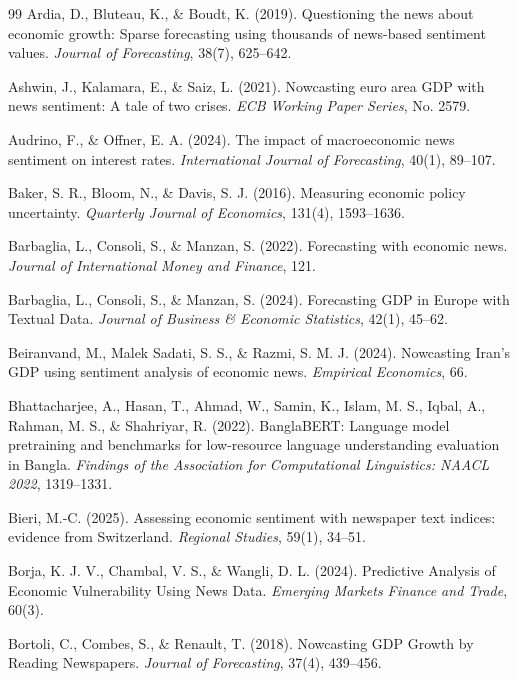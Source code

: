 \documentclass[12pt,oneside]{article}
\begin{document}
\begin{thebibliography}{99}
 Ardia, D., Bluteau, K., \& Boudt, K. (2019). Questioning the news about economic growth: Sparse forecasting using thousands of news-based sentiment values. \textit{Journal of Forecasting}, 38(7), 625--642.

 Ashwin, J., Kalamara, E., \& Saiz, L. (2021). Nowcasting euro area GDP with news sentiment: A tale of two crises. \textit{ECB Working Paper Series}, No. 2579.

 Audrino, F., \& Offner, E. A. (2024). The impact of macroeconomic news sentiment on interest rates. \textit{International Journal of Forecasting}, 40(1), 89--107.

 Baker, S. R., Bloom, N., \& Davis, S. J. (2016). Measuring economic policy uncertainty. \textit{Quarterly Journal of Economics}, 131(4), 1593--1636.

 Barbaglia, L., Consoli, S., \& Manzan, S. (2022). Forecasting with economic news. \textit{Journal of International Money and Finance}, 121.

 Barbaglia, L., Consoli, S., \& Manzan, S. (2024). Forecasting GDP in Europe with Textual Data. \textit{Journal of Business \& Economic Statistics}, 42(1), 45--62.

 Beiranvand, M., Malek Sadati, S. S., \& Razmi, S. M. J. (2024). Nowcasting Iran's GDP using sentiment analysis of economic news. \textit{Empirical Economics}, 66.

 Bhattacharjee, A., Hasan, T., Ahmad, W., Samin, K., Islam, M. S., Iqbal, A., Rahman, M. S., \& Shahriyar, R. (2022). BanglaBERT: Language model pretraining and benchmarks for low-resource language understanding evaluation in Bangla. \textit{Findings of the Association for Computational Linguistics: NAACL 2022}, 1319--1331.

 Bieri, M.-C. (2025). Assessing economic sentiment with newspaper text indices: evidence from Switzerland. \textit{Regional Studies}, 59(1), 34--51.

 Borja, K. J. V., Chambal, V. S., \& Wangli, D. L. (2024). Predictive Analysis of Economic Vulnerability Using News Data. \textit{Emerging Markets Finance and Trade}, 60(3).

 Bortoli, C., Combes, S., \& Renault, T. (2018). Nowcasting GDP Growth by Reading Newspapers. \textit{Journal of Forecasting}, 37(4), 439--456.


\end{thebibliography}
\end{document}
